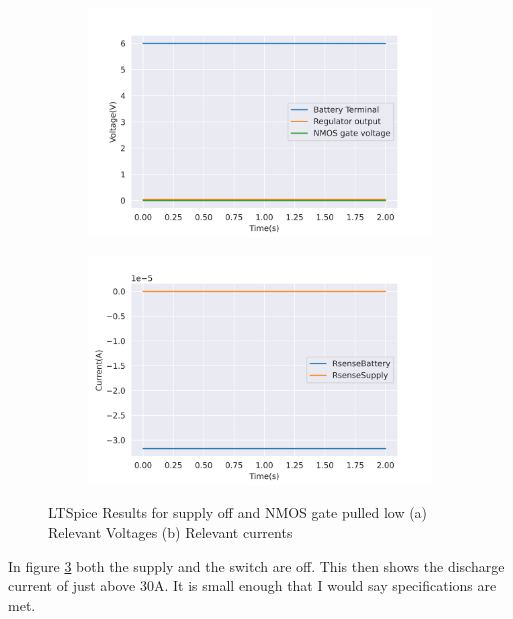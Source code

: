  \begin{figure}[!htb]
 \footnotesize
 \centering
    \begin{subfigure}[]{0.42\textwidth}
              \centering
  		\includegraphics[width=1\linewidth]{./Figures/A2-5.png}
		    \caption{} \label{subfig:A2-5}
     \end{subfigure}
     \begin{subfigure}[]{0.42\textwidth}
             \centering
  		\includegraphics[width=1\linewidth]{./Figures/A2-6.png}
		   \caption{ } \label{subfig:A2-6}
     \end{subfigure}
   \caption[{LTSPICE switch off and supply off results}]{LTSpice Results for supply off and NMOS gate pulled low  (a)  Relevant Voltages (b)  Relevant currents  }
    \label{fig:three}
 \end{figure}
In figure \ref{fig:three} both the supply and the switch are off. This then shows the discharge current of just above 30\textmu A. It is small enough that I would say specifications are met.


